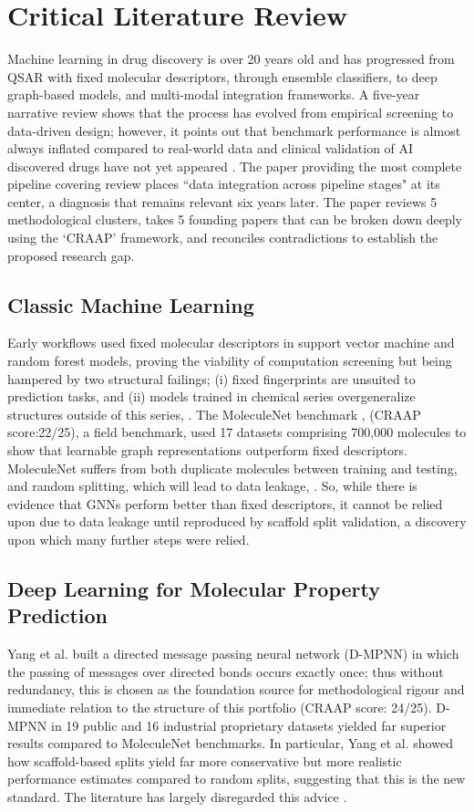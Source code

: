 \documentclass[conference]{IEEEtran}
\begin{document}
\section{Critical Literature Review}
Machine learning in drug discovery is over 20 years old and has progressed from QSAR with fixed molecular descriptors, through ensemble classifiers, to deep graph-based models, and multi-modal integration frameworks. A five-year narrative review shows that the process has evolved from empirical screening to data-driven design; however, it points out that benchmark performance is almost always inflated compared to real-world data and clinical validation of AI discovered drugs have not yet appeared \cite{b2}. The paper providing the most complete pipeline covering review \cite{b3} places ``data integration across pipeline stages" at its center, a diagnosis that remains relevant six years later. The paper reviews 5 methodological clusters, takes 5 founding papers that can be broken down deeply using the `CRAAP' framework, and reconciles contradictions to establish the proposed research gap.

\subsection{Classic Machine Learning}
Early workflows used fixed molecular descriptors in support vector machine and random forest models, proving the viability of computation screening but being hampered by two structural failings; (i) fixed fingerprints are unsuited to prediction tasks, and (ii) models trained in chemical series overgeneralize structures outside of this series, \cite{b3}. The MoleculeNet benchmark \cite{b6}, (CRAAP score:22/25), a field benchmark, used 17 datasets comprising 700,000 molecules to show that learnable graph representations outperform fixed descriptors. MoleculeNet suffers from both duplicate molecules between training and testing, and random splitting, which will lead to data leakage, \cite{b4}. So, while there is evidence that GNNs perform better than fixed descriptors, it cannot be relied upon due to data leakage until reproduced by scaffold split validation, a discovery upon which many further steps were relied.

\subsection{Deep Learning for Molecular Property Prediction}
 Yang et al. \cite{b5} built a directed message passing neural network (D-MPNN) in which the passing of messages over directed bonds occurs exactly once; thus without redundancy, this is chosen as the foundation source for methodological rigour and immediate relation to the structure of this portfolio (CRAAP score: 24/25). D-MPNN in 19 public and 16 industrial proprietary datasets yielded far superior results compared to MoleculeNet benchmarks. In particular, Yang et al. \cite{b5} showed how scaffold-based splits yield far more conservative but more realistic performance estimates compared to random splits, suggesting that this is the new standard. The literature has largely disregarded this advice \cite{b4}.
 
\end{document}
